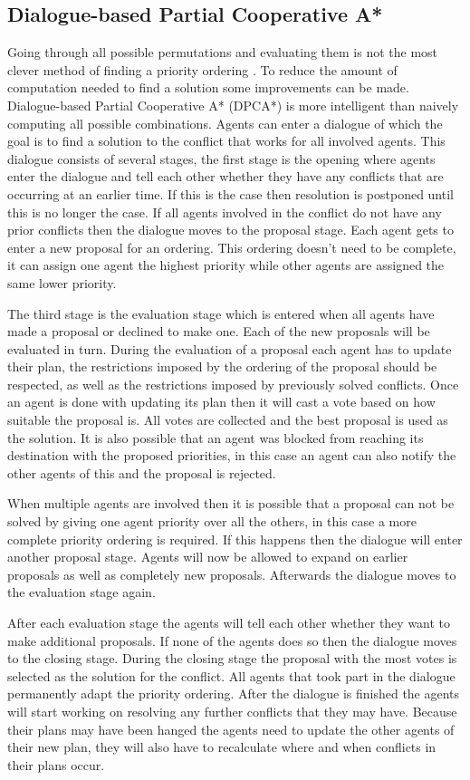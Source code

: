 \subsection{Dialogue-based Partial Cooperative A*}
Going through all possible permutations and evaluating them is not the most
clever method of finding a priority ordering \cite{bennewitz2002}. To reduce
the amount of computation needed to find a solution some improvements can be
made. Dialogue-based Partial Cooperative A* (DPCA*) is more intelligent
than naively computing all possible combinations. Agents can enter a
dialogue of which the goal is to find a solution to
the conflict that works for all involved agents. This dialogue consists of
several stages, the first stage is the opening where agents enter the dialogue
and tell each other whether they have any conflicts that are occurring at an
earlier time. If this is the case then resolution is postponed until this is
no longer the case. If all agents involved in the conflict do not have any
prior conflicts then the dialogue moves to the proposal stage. Each agent
gets to enter a new proposal for an ordering. This ordering doesn't need to be
complete, it can assign one agent the highest priority while other agents are
assigned the same lower priority.

The third stage is the evaluation stage which is entered when all agents have
made a proposal or declined to make one. Each of the new proposals will be
evaluated in turn. During the evaluation of a proposal each agent has to update
their plan, the restrictions imposed by the ordering of the proposal should be
respected, as well as the restrictions imposed by previously solved conflicts.
Once an
agent is done with updating its plan then it will cast a vote based on how
suitable the proposal is. All votes are collected and the best proposal is
used as the solution. It is also possible that an agent was blocked from
reaching its destination with the proposed priorities, in this case an agent
can also notify the other agents of this and the proposal is rejected.

When multiple agents are involved then it is possible that a proposal can not
be solved by giving one agent priority over all the others, in this case a more
complete priority ordering is required. If this happens then the dialogue will
enter another proposal stage. Agents will now be allowed to expand on earlier
proposals as well as completely new proposals. Afterwards the dialogue moves to
the evaluation stage again.

After each evaluation stage the agents will tell each other whether they want
to make additional proposals. If none of the agents does so then the dialogue
moves to the closing stage. During the closing stage the proposal with the most
votes is selected as the solution for the conflict. All agents that took part
in the dialogue permanently adapt the priority ordering. After the dialogue is
finished the agents will start working on resolving any further conflicts that
they may have. Because their plans may have been hanged the agents need to
update the other agents of their new plan, they will also have to recalculate
where and when conflicts in their plans occur.

